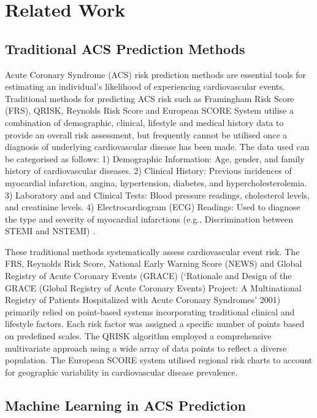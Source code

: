 \section{Related Work}
\subsection{Traditional ACS Prediction Methods}

Acute Coronary Syndrome (ACS) risk prediction methods are essential tools for estimating an individual's likelihood of experiencing cardiovascular events. Traditional methods for predicting ACS risk such as Framingham Risk Score (FRS)\cite{Hemann2007Framingham}, QRISK\cite{Hippisley2017Development}, Reynolds Risk Score \cite{Ridker2007Development} and European SCORE System \cite{Nashef1999European} utilise a combination of demographic, clinical, lifestyle and medical history data to provide an overall risk assessment, but frequently cannot be utilised once a diagnosis of underlying cardiovascular disease has been made. The data used can be categorised as follows: 1) Demographic Information: Age, gender, and family history of cardiovascular diseases\cite{Steen2022Event}. 2) Clinical History: Previous incidences of myocardial infarction, angina, hypertension, diabetes, and hypercholesterolemia. 3) Laboratory and and Clinical Tests: Blood pressure readings, cholesterol levels, and creatinine levels. 4) Electrocardiogram (ECG) Readings: Used to diagnose the type and severity of myocardial infarctions (e.g., Discrimination between STEMI and NSTEMI) \cite{Bhatt2022Diagnosis}.

These traditional methods systematically assess cardiovascular event risk. The FRS, Reynolds Risk Score, National Early Warning Score (NEWS) \cite{Smith2013ability}  and Global Registry of Acute Coronary Events (GRACE) (‘Rationale and Design of the GRACE (Global Registry of Acute Coronary Events) Project: A Multinational Registry of Patients Hospitalized with Acute Coronary Syndromes’ 2001) primarily relied on point-based systems incorporating traditional clinical and lifestyle factors. Each risk factor was assigned a specific number of points based on predefined scales. The QRISK algorithm employed a comprehensive multivariate approach using a wide array of data points to reflect a diverse population. The European SCORE system utilised regional risk charts to account for geographic variability in cardiovascular disease prevalence. 

\subsection{Machine Learning in ACS Prediction}

